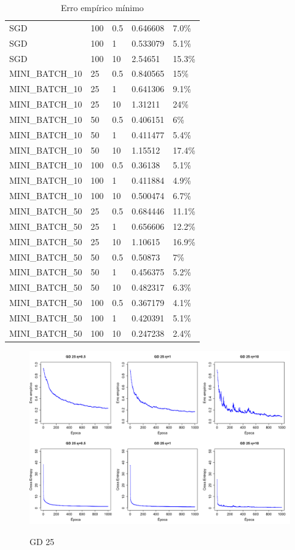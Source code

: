 \documentclass{report}
\begin{document}
\begin{table}
\begin{tabular}{ |l|l|l| l l| }
  \hline
  SGD             & 100 & 0.5  & 0.646608 & 7.0\%  \\ 
  SGD             & 100 & 1    & 0.533079 & 5.1\% \\
  SGD             & 100 & 10   & 2.54651  & 15.3\% \\
  \hline
  MINI\_BATCH\_10 & 25  & 0.5 & 0.840565 & 15\%   \\
  MINI\_BATCH\_10 & 25  & 1   & 0.641306 & 9.1\%  \\    
  MINI\_BATCH\_10 & 25  & 10  & 1.31211  & 24\%   \\
  \hline
  MINI\_BATCH\_10 & 50  & 0.5 & 0.406151 & 6\%    \\
  MINI\_BATCH\_10 & 50  & 1   & 0.411477 & 5.4\%  \\
  MINI\_BATCH\_10 & 50  & 10  & 1.15512  & 17.4\% \\
  \hline
  MINI\_BATCH\_10 & 100 & 0.5 & 0.36138  & 5.1\%  \\
  MINI\_BATCH\_10 & 100 & 1   & 0.411884 & 4.9\%  \\
  MINI\_BATCH\_10 & 100 & 10  & 0.500474 & 6.7\%  \\
  \hline
  MINI\_BATCH\_50 & 25  & 0.5 & 0.684446 & 11.1\% \\
  MINI\_BATCH\_50 & 25  & 1   & 0.656606 & 12.2\% \\
  MINI\_BATCH\_50 & 25  & 10  & 1.10615  & 16.9\% \\
  \hline
  MINI\_BATCH\_50 & 50  & 0.5 & 0.50873  & 7\%    \\
  MINI\_BATCH\_50 & 50  & 1   & 0.456375 & 5.2\%  \\
  MINI\_BATCH\_50 & 50  & 10  & 0.482317 & 6.3\%  \\
  \hline
  MINI\_BATCH\_50 & 100 & 0.5 & 0.367179 & 4.1\%  \\
  MINI\_BATCH\_50 & 100 & 1   & 0.420391 & 5.1\%  \\
  MINI\_BATCH\_50 & 100 & 10  & 0.247238 & 2.4\%  \\
  \hline
\end{tabular}
\label{tab:min_error}
\caption{Erro empírico mínimo}
\end{table}

\begin{figure}
  \includegraphics[width=\linewidth]{gd_25.png}
  \label{fig:gd_25}
  \caption{GD 25}
\end{figure}
\end{document}
